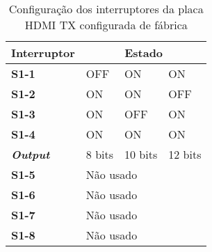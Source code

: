 
\begin{table}[h!]
	\centering
		\caption{Configuração dos interruptores da placa HDMI TX configurada de fábrica}
	\label{table:HDMI_default_switches_TX}
	\begin{tabular}{@{}llll@{}}
		\toprule
		\multicolumn{1}{c}{\textbf{Interruptor}} & \multicolumn{3}{c}{\textbf{Estado}} \\ \midrule
		\multicolumn{1}{l|}{\textbf{S1-1}} & OFF & ON & ON \\
		\multicolumn{1}{l|}{\textbf{S1-2}} & ON & ON & OFF \\
		\multicolumn{1}{l|}{\textbf{S1-3}} & ON & OFF & ON \\
		\multicolumn{1}{l|}{\textbf{S1-4}} & ON & ON & ON \\
		\multicolumn{1}{l|}{\textbf{\textit{Output}}} & 8 bits & 10 bits & 12 bits \\
		\multicolumn{1}{l|}{\textbf{S1-5}} & \multicolumn{3}{l}{Não usado} \\
		\multicolumn{1}{l|}{\textbf{S1-6}} & \multicolumn{3}{l}{Não usado} \\
		\multicolumn{1}{l|}{\textbf{S1-7}} & \multicolumn{3}{l}{Não usado} \\
		\multicolumn{1}{l|}{\textbf{S1-8}} & \multicolumn{3}{l}{Não usado} \\ \bottomrule
	\end{tabular}
\end{table}


